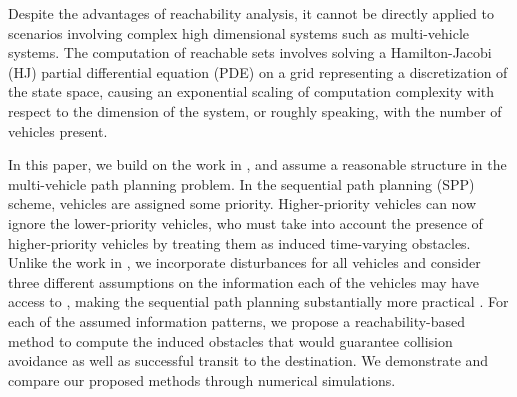 
Despite the advantages of reachability analysis, it cannot be directly applied to scenarios involving complex high dimensional systems such as multi-vehicle systems. The computation of reachable sets involves solving a Hamilton-Jacobi (HJ) partial differential equation (PDE) on a grid representing a discretization of the state space, causing an exponential scaling of computation complexity with respect to the dimension of the system, or roughly speaking, with the number of vehicles present.

In this paper, we build on the work in \cite{Chen15}, and assume a reasonable structure in the multi-vehicle path planning problem. In the sequential path planning (SPP) scheme, vehicles are assigned some priority.  Higher-priority vehicles can now ignore the lower-priority vehicles, who must take into account the presence of higher-priority vehicles by treating them as induced time-varying obstacles. Unlike the work in \cite{Chen15}, we incorporate disturbances for all vehicles  and consider three different assumptions on the information each of the vehicles may have access to , making the sequential path planning substantially more practical . For each of the assumed information patterns, we propose a reachability-based method to compute the induced obstacles that would guarantee collision avoidance as well as successful transit to the destination. We demonstrate and compare our proposed methods through numerical simulations.